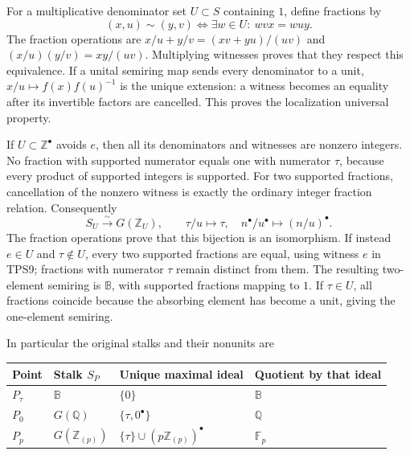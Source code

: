 \documentclass[
  10pt,
]{article}
\newcounter{none} %
\begin{document}
For a multiplicative denominator set \(U\subset S\) containing \(1\),
define fractions by \[
(x,u)\sim(y,v)\iff\exists w\in U:\ wvx=wuy.
\tag{TPS9}
\] The fraction operations are \(x/u+y/v=(xv+yu)/(uv)\) and
\((x/u)(y/v)=xy/(uv)\). Multiplying witnesses proves that they respect
this equivalence. If a unital semiring map sends every denominator to a
unit, \(x/u\mapsto f(x)f(u)^{-1}\) is the unique extension: a witness
becomes an equality after its invertible factors are cancelled. This
proves the localization universal property.

If \(U\subset\mathbb Z^\bullet\) avoids \(e\), then all its denominators
and witnesses are nonzero integers. No fraction with supported numerator
equals one with numerator \(\tau\), because every product of supported
integers is supported. For two supported fractions, cancellation of the
nonzero witness is exactly the ordinary integer fraction relation.
Consequently \[
S_U\xrightarrow{\sim}G(\mathbb Z_U),\qquad
\tau/u\mapsto\tau,\quad n^\bullet/u^\bullet\mapsto(n/u)^\bullet.
\tag{TPS10}
\] The fraction operations prove that this bijection is an isomorphism.
If instead \(e\in U\) and \(\tau\notin U\), every two supported
fractions are equal, using witness \(e\) in TPS9; fractions with
numerator \(\tau\) remain distinct from them. The resulting two-element
semiring is \(\mathbb B\), with supported fractions mapping to \(1\). If
\(\tau\in U\), all fractions coincide because the absorbing element has
become a unit, giving the one-element semiring.

In particular the original stalks and their nonunits are

{\def\LTcaptype{none} %
\begin{longtable}[]{@{}
  >{\raggedright\arraybackslash}p{}
  >{\raggedright\arraybackslash}p{}
  >{\raggedright\arraybackslash}p{}
  >{\raggedright\arraybackslash}p{}@{}}
\toprule\noalign{}
\begin{minipage}[b]{\linewidth}\raggedright
Point
\end{minipage} & \begin{minipage}[b]{\linewidth}\raggedright
Stalk \(S_P\)
\end{minipage} & \begin{minipage}[b]{\linewidth}\raggedright
Unique maximal ideal
\end{minipage} & \begin{minipage}[b]{\linewidth}\raggedright
Quotient by that ideal
\end{minipage} \\
\midrule\noalign{}
\endhead
\bottomrule\noalign{}
\endlastfoot
\(P_\tau\) & \(\mathbb B\) & \(\{0\}\) & \(\mathbb B\) \\
\(P_0\) & \(G(\mathbb Q)\) & \(\{\tau,0^\bullet\}\) & \(\mathbb Q\) \\
\(P_p\) & \(G(\mathbb Z_{(p)})\) &
\(\{\tau\}\cup(p\mathbb Z_{(p)})^\bullet\) & \(\mathbb F_p\) \\
\end{longtable}
}
\end{document}
